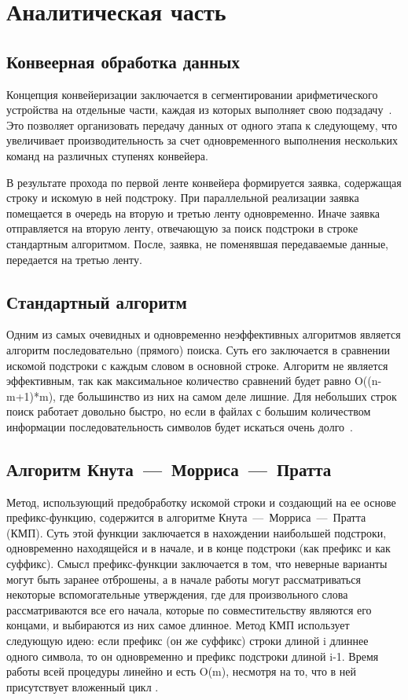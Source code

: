 \section{Аналитическая часть}

\subsection{Конвеерная обработка данных}
Концепция конвейеризации заключается в сегментировании арифметического устройства на отдельные части, каждая из которых выполняет свою подзадачу~\cite{богданов2004архитектуры}.
Это позволяет организовать передачу данных от одного этапа к следующему, что увеличивает производительность за счет одновременного выполнения нескольких команд на различных ступенях конвейера.

В результате прохода по первой ленте конвейера формируется заявка, содержащая строку и искомую в ней подстроку.
При параллельной реализации заявка помещается в очередь на вторую и третью ленту одновременно.
Иначе заявка отправляется на вторую ленту, отвечающую за поиск подстроки в строке стандартным алгоритмом. После, заявка, не поменявшая передаваемые данные, передается на третью ленту.


\subsection{Стандартный алгоритм}
Одним из самых очевидных и одновременно неэффективных алгоритмов является алгоритм последовательно (прямого) поиска. 
Суть его заключается в сравнении искомой подстроки с каждым словом в основной строке. 
Алгоритм не является эффективным, так как максимальное количество сравнений будет равно O((n-m+1)*m), где большинство из них на самом деле лишние. 
Для небольших строк поиск работает довольно быстро, но если в файлах с большим количеством информации последовательность символов будет искаться очень долго~\cite{вирт2010алгоритмы}.

\subsection{Алгоритм Кнута~---~Морриса~---~Пратта}
Метод, использующий предобработку искомой строки и создающий на ее основе префикс-функцию, содержится в алгоритме Кнута~---~Морриса~---~Пратта (КМП). 
Суть этой функции заключается в нахождении наибольшей подстроки, одновременно находящейся и в начале, и в конце подстроки (как префикс и как суффикс). 
Смысл префикс-функции заключается в том, что неверные варианты могут быть заранее отброшены, а в начале работы могут рассматриваться некоторые вспомогательные утверждения, где для произвольного слова рассматриваются все его начала, которые по совместительству являются его концами, и выбираются из них самое длинное. 
Метод КМП использует следующую идею: если префикс (он же суффикс) строки длиной i длиннее одного символа, то он одновременно и префикс подстроки длиной i-1. Время работы всей процедуры линейно и есть O(m), несмотря на то, что в ней присутствует вложенный цикл \cite{солдатова2018основные}.

